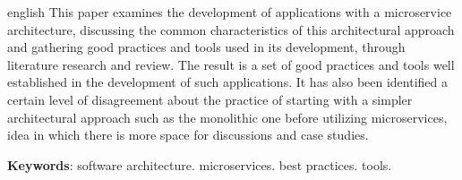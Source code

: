 \setlength{\absparsep}{18pt} %
\begin{resumo}[Abstract]
 \begin{otherlanguage*}{english}
   This paper examines the development of applications with a microservice architecture, discussing the common characteristics of this architectural approach and gathering good practices and tools used in its development, through literature research and review. The result is a set of good practices and tools well established in the development of such applications. It has also been identified a certain level of disagreement about the practice of starting with a simpler architectural approach such as the monolithic one before utilizing microservices, idea in which there is more space for discussions and case studies.

   \vspace{\onelineskip}
 
   \noindent 
   \textbf{Keywords}: software architecture. microservices. best practices. tools.
 \end{otherlanguage*}
\end{resumo}
